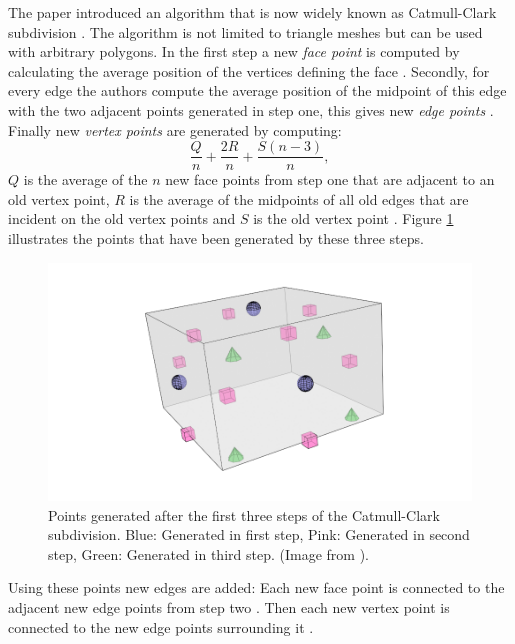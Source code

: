 The paper  introduced an algorithm that is now widely known as Catmull-Clark subdivision \cite{CATMULL1978350}.
The algorithm is not limited to triangle meshes but can be used with arbitrary polygons.
In the first step a new \textit{face point} is computed by calculating the average position of the vertices defining the face \cite{CATMULL1978350}.
Secondly, for every edge the authors compute the average position of the midpoint of this edge with the two adjacent points generated in step one, this gives new \textit{edge points} \cite{CATMULL1978350}.
Finally new \textit{vertex points} are generated by computing:
\begin{equation*}
	\frac{Q}{n} + \frac{2R}{n} + \frac{S(n-3)}{n},
\end{equation*}
$Q$ is the average of the $n$ new face points from step one that are adjacent to an old vertex point, $R$ is the average of the midpoints of all old edges that are incident on the old vertex points and $S$ is the old vertex point \cite{CATMULL1978350}.
Figure \ref{fig:catmull_clark_new_points} illustrates the points that have been generated by these three steps.
\begin{figure}[ht]
    \centering
    \includegraphics[width=0.5\linewidth]{img/catmull_clark_new_points.png}
    \caption{Points generated after the first three steps of the Catmull-Clark subdivision. Blue: Generated in first step, Pink: Generated in second step, Green: Generated in third step. (Image from \cite{catmull_clark_step_3}).}
    \label{fig:catmull_clark_new_points}
\end{figure}
Using these points new edges are added: Each new face point is connected to the adjacent new edge points from step two \cite{CATMULL1978350}.
Then each new vertex point is connected to the new edge points surrounding it \cite{CATMULL1978350}.

